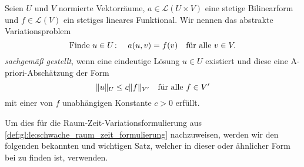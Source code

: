 \begin{Definition}[Hadamard]
\label{def:gl:le:hadamard_sachgemaess_gestellt}
    Seien $U$ und $V$ normierte Vektorräume, $a \in \mathcal L(U \times V)$ eine stetige Bilinearform und $f \in \mathcal L(V)$ ein stetiges lineares Funktional.
    Wir nennen das abstrakte Variationsproblem
    \begin{equation}
    \label{eq:gl:le:hadamard_variationsproblem}
        \text{Finde } u \in U \colon \quad a(u, v) = f(v) \quad \fa v \in V.
    \end{equation}
    \emph{sachgemäß gestellt}, wenn eine eindeutige Lösung $u \in U$ existiert und diese eine A-priori-Abschätzung der Form
    \begin{equation}
    \label{eq:gl:le:hadamard_abschaetzung}
        \norm{u}_{U} \leq c \norm{f}_{V'} \quad \fa f \in V'
    \end{equation}
    mit einer von $f$ unabhängigen Konstante $c > 0$ erfüllt.
\end{Definition}

Um dies für die Raum-Zeit-Variationsformulierung aus \cref{def:gl:le:schwache_raum_zeit_formulierung} nachzuweisen, werden wir den folgenden bekannten und wichtigen Satz, welcher in dieser oder ähnlicher Form bei \textcites[Theorem 2.1]{Babuska:1971fx}[Theorem 5.2.1]{Aziz:2014wf}[Theorem \S{}3.3.6]{Braess:2007wm} zu finden ist, verwenden.

